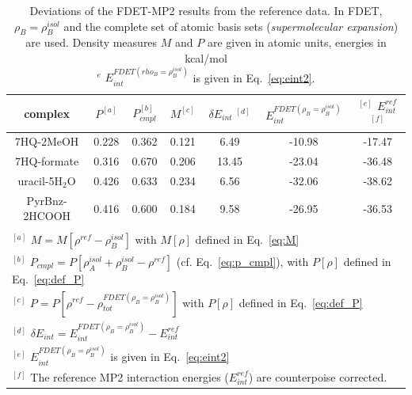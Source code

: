 \documentclass[amsmath,amssymb,preprint,aip,jcp]{revtex4-1}
\begin{document}
\begin{table}
{
\begin{center}
\begin{tabular}{|c|c|c|c|c|c|c|}
\hline
 complex & $P^{[a]}$ & $P_{cmpl}^{[b]}$ & $M^{[c]}$ & $\delta E_{int}\;^{[d]}$ & $E^{FDET(\rho_B=\rho_B^{isol})}_{int}$ & $^{[e]}$ $E_{int}^{ref}$ $^{[f]}$ \\ \hline
7HQ-2MeOH & 0.228 & 0.362 & 0.121 & 6.49 & -10.98 & -17.47 \\ \hline
7HQ-formate & 0.316 & 0.670 & 0.206 & 13.45 & -23.04 & -36.48 \\ \hline
uracil-5H$_2$O & 0.426 & 0.633 & 0.234 & 6.56 & -32.06 & -38.62 \\ \hline
PyrBnz-2HCOOH & 0.416 & 0.600 & 0.184 & 9.58 & -26.95 & -36.53 \\ \hline
\multicolumn{7}{c}{ } \\
\multicolumn{7}{l}{$^{[a]}$ $M=M[\rho^{ref} - \rho^{isol}_{B}]$ with $M[\rho]$ defined in Eq.~\ref{eq:M}}\\
\multicolumn{7}{l}{$^{[b]}$ $P_{cmpl}=P[\rho_A^{isol}+\rho_B^{isol} - \rho^{ref}]$ (cf. Eq.~\ref{eq:p_cmpl}), with $P[\rho]$ defined in Eq.~\ref{eq:def_P}}\\
\multicolumn{7}{l}{$^{[c]}$ $P=P[\rho^{ref} - \rho_{tot}^{FDET(\rho_B=\rho_B^{isol})}]$ with $P[\rho]$ defined in Eq.~\ref{eq:def_P}}\\
\multicolumn{7}{l}{$^{[d]}$ $\delta E_{int}=E^{FDET(\rho_B=\rho_B^{isol})}_{int}-E_{int}^{ref}$} \\
\multicolumn{7}{l}{$^{[e]}$ $E^{FDET(\rho_B=\rho_B^{isol})}_{int}$ is given in Eq.~\ref{eq:eint2}}\\
\multicolumn{7}{l}{$^{[f]}$ The reference MP2 interaction energies ($E_{int}^{ref}$) are counterpoise corrected.}
\end{tabular}
\end{center}
}%
\caption{Deviations of the FDET-MP2 results from the reference data. In FDET, $\rho_B=\rho_B^{isol}$ and the complete set of atomic basis sets ({\it supermolecular expansion}) are used. 
Density measures $M$ and $P$ are given in atomic units, energies in kcal/mol\\
$^e$ $E^{FDET(rho_B=\rho_B^{isol})}_{int}$ is given in Eq.~\ref{eq:eint2}.
}
\label{table:SE_isol}
\end{table}

\end{document}
